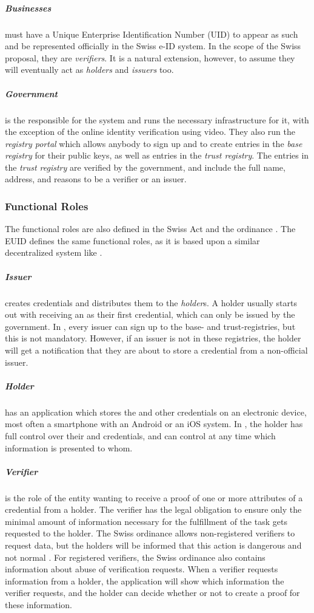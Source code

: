\subparagraph{Businesses}
must have a Unique Enterprise Identification Number (UID) to appear as such and be represented officially in the Swiss e-ID system.
In the scope of the Swiss proposal, they are \emph{verifiers}.
It is a natural extension, however, to assume they will eventually act as \emph{holders} and \emph{issuers} too.

\subparagraph{Government}
is the responsible for the system and runs the necessary infrastructure for it, with the exception of the online identity verification using video.
They also run the \emph{registry portal} which allows anybody to sign up and to create entries in the \emph{base registry} for their public keys, as well as entries in the \emph{trust registry}.
The entries in the \emph{trust registry} are verified by the government, and include the full name, address, and reasons to be a verifier or an issuer.

\subsubsection{Functional Roles}

The functional roles are also defined in the Swiss \eid Act \cite{BGEID24} and the ordinance \cite{VEID25}.
The EUID \cite{EUDI-ARF} defines the same functional roles, as it is based upon a similar decentralized system like \swiyu.


\subparagraph{Issuer} creates credentials and distributes them to the \emph{holder}s.
A holder usually starts out with receiving an \eid as their first credential, which can only be issued by the government.
In \swiyu, every issuer can sign up to the base- and trust-registries, but this is not mandatory.
However, if an issuer is not in these registries, the holder will get a notification that they are about to store a credential from a non-official issuer.

\subparagraph{Holder} has an application which stores the \eid and other credentials on an electronic device, most often a smartphone with an Android or an iOS system.
In \swiyu, the holder has full control over their \eid and credentials, and can control at any time which information is presented to whom.

\subparagraph{Verifier} is the role of the entity wanting to receive a proof of one or more attributes of a credential from a holder.
The verifier has the legal obligation to ensure only the minimal amount of information necessary for the fulfillment of the task gets requested to the holder.
The Swiss ordinance allows non-registered verifiers to request data, but the holders will be informed that this action is dangerous and not normal \cite[Art. 14]{VEID25}.
For registered verifiers, the Swiss ordinance also contains information about abuse of verification requests.
When a verifier requests information from a holder, the application will show which information the verifier requests, and the holder can decide whether or not to create a proof for these information.
